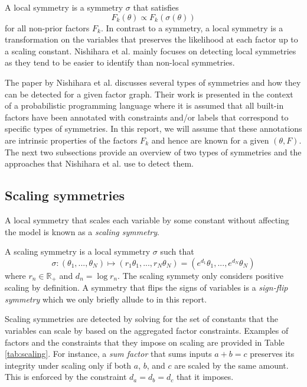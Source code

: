 \begin{defn}
A local symmetry is a symmetry $\sigma$ that satisfies
\[
F_k(\theta) \propto F_k\left(\sigma(\theta)\right)
\]
for all non-prior factors $F_k$. In contrast to a symmetry, a local symmetry is a transformation on the variables that preserves the likelihood at each factor up to a scaling constant. Nishihara et al. mainly focuses on detecting local symmetries as they tend to be easier to identify than non-local symmetries.
\end{defn}

The paper by Nishihara et al. discusses several types of symmetries and how they can be detected for a given factor graph. Their work is presented in the context of a probabilistic programming language where it is assumed that all built-in factors have been annotated with constraints and/or labels that correspond to specific types of symmetries. In this report, we will assume that these annotations are intrinsic properties of the factors $F_k$ and hence are known for a given $(\theta,F)$. The next two subsections provide an overview of two types of symmetries and the approaches that Nishihara et al. use to detect them.


\subsection{Scaling symmetries} \label{sec:scaling}

A local symmetry that scales each variable by some constant without affecting the model is known as a \textit{scaling symmetry}.

\begin{defn}
A scaling symmetry is a local symmetry $\sigma$ such that
\[
\sigma: (\theta_1,...,\theta_N) \longmapsto (r_1\theta_1,...,r_N\theta_N) = (e^{d_1}\theta_1,...,e^{d_N}\theta_N)
\]
where $r_n\in\mathbb{R}_+$ and $d_n=\log r_n$. The scaling symmety only considers positive scaling by definition. A symmetry that flips the signs of variables is a \textit{sign-flip symmetry} which we only briefly allude to in this report.
\end{defn}

Scaling symmetries are detected by solving for the set of constants that the variables can scale by based on the aggregated factor constraints. Examples of factors and the constraints that they impose on scaling are provided in Table \ref{tab:scaling}. For instance, a \textit{sum factor} that sums inputs $a+b=c$ preserves its integrity under scaling only if both $a$, $b$, and $c$ are scaled by the same amount. This is enforced by the constraint $d_a=d_b=d_c$ that it imposes.

